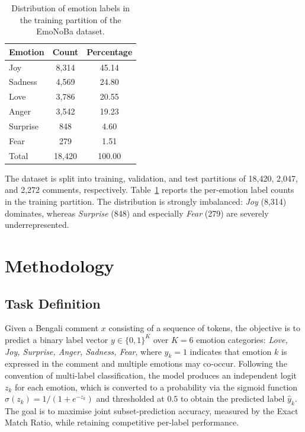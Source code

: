 \documentclass[runningheads]{llncs}
\begin{document}
\begin{table}[htbp]
\centering
\caption{Distribution of emotion labels in the training partition of the EmoNoBa dataset.}
\label{tab:labels}
\begin{tabular}{lcc}
\toprule
\textbf{Emotion} & \textbf{Count} & \textbf{Percentage} \\
\midrule
Joy      & 8,314 & 45.14 \\
Sadness  & 4,569 & 24.80 \\
Love     & 3,786 & 20.55 \\
Anger    & 3,542 & 19.23 \\
Surprise &   848 &  4.60 \\
Fear     &   279 &  1.51 \\
\midrule
Total    & 18,420 & 100.00 \\
\bottomrule
\end{tabular}
\end{table}

The dataset is split into training, validation, and test partitions of 18,420, 2,047, and 2,272 comments, respectively. Table~\ref{tab:labels} reports the per-emotion label counts in the training partition. The distribution is strongly imbalanced: \emph{Joy} (8,314) dominates, whereas \emph{Surprise} (848) and especially \emph{Fear} (279) are severely underrepresented. 




\section{Methodology}\label{sec:method}

\subsection{Task Definition}\label{sec:task}
Given a Bengali comment $x$ consisting of a sequence of tokens, the objective is to predict a binary label vector $y \in \{0, 1\}^{K}$ over $K = 6$ emotion categories: \emph{Love, Joy, Surprise, Anger, Sadness, Fear}, where $y_k = 1$ indicates that emotion $k$ is expressed in the comment and multiple emotions may co-occur. Following the convention of multi-label classification, the model produces an independent logit $z_k$ for each emotion, which is converted to a probability via the sigmoid function $\sigma(z_k) = 1/(1 + e^{-z_k})$ and thresholded at $0.5$ to obtain the predicted label $\hat{y}_k$. The goal is to maximise joint subset-prediction accuracy, measured by the Exact Match Ratio, while retaining competitive per-label performance.
\end{document}
